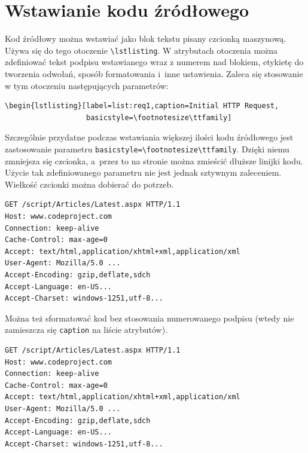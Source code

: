 \section{Wstawianie kodu źródłowego}
Kod źródłowy można wstawiać jako blok tekstu pisany czcionką maszynową. Używa się do tego otoczenie \verb?\lstlisting?. W atrybutach otoczenia można zdefiniować tekst podpisu wstawianego wraz z numerem nad blokiem, etykietę do tworzenia odwołań, sposób formatowania i~inne ustawienia. Zaleca się stosowanie w tym otoczeniu następujących parametrów:
\begin{lstlisting}[basicstyle=\footnotesize\ttfamily]
\begin{lstlisting}[label=list:req1,caption=Initial HTTP Request,
                   basicstyle=\footnotesize\ttfamily]
\end{lstlisting}
Szczególnie przydatne podczas wstawiania większej ilości kodu źródłowego jest zastosowanie parametru \verb+basicstyle=\footnotesize\ttfamily+. Dzięki niemu zmniejsza się czcionka, a~przez to na stronie można zmieścić dłuższe linijki kodu. Użycie tak zdefiniowanego parametru nie jest jednak sztywnym zaleceniem. Wielkość czcionki można dobierać do potrzeb. 
{\belowcaptionskip=-10pt
\begin{lstlisting}[label=list:req1,caption=Initial HTTP Request,
                   basicstyle=\footnotesize\ttfamily]
GET /script/Articles/Latest.aspx HTTP/1.1
Host: www.codeproject.com
Connection: keep-alive
Cache-Control: max-age=0
Accept: text/html,application/xhtml+xml,application/xml
User-Agent: Mozilla/5.0 ...
Accept-Encoding: gzip,deflate,sdch
Accept-Language: en-US...
Accept-Charset: windows-1251,utf-8...
\end{lstlisting}
}
Można też sformatować kod bez stosowania numerowanego podpisu (wtedy nie zamieszcza się \texttt{caption} na liście atrybutów).
\begin{lstlisting}[basicstyle=\footnotesize\ttfamily]
GET /script/Articles/Latest.aspx HTTP/1.1
Host: www.codeproject.com
Connection: keep-alive
Cache-Control: max-age=0
Accept: text/html,application/xhtml+xml,application/xml
User-Agent: Mozilla/5.0 ...
Accept-Encoding: gzip,deflate,sdch
Accept-Language: en-US...
Accept-Charset: windows-1251,utf-8...
\end{lstlisting}

